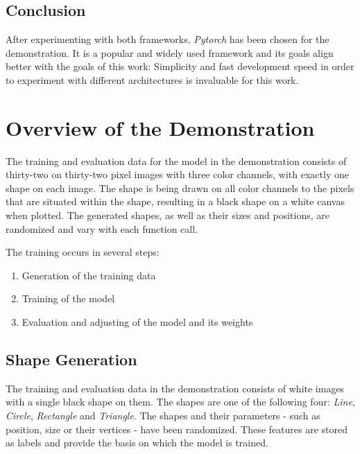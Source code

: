 \documentclass[12pt, a4paper, titlepage]{report}
\begin{document}
\subsection{Conclusion}

After experimenting with both frameworks, \emph{Pytorch} has been chosen for the demonstration. It is a popular and widely used framework and its goals align better with the goals of this work: Simplicity and fast development speed in order to experiment with different architectures is invaluable for this work.
\vspace{0.5cm}


\section{Overview of the Demonstration}

The training and evaluation data for the model in the demonstration consists of thirty-two on thirty-two pixel images with three color channels, with exactly one shape on each image. The shape is being drawn on all color channels to the pixels that are situated within the shape, resulting in a black shape on a white canvas when plotted.
The generated shapes, as well as their sizes and positions, are randomized and vary with each function call.

\vspace{0.2cm}
The training occurs in several steps:

\begin{enumerate}[label=\Roman*.]
   \item Generation of the training data
   \item Training of the model
   \item Evaluation and adjusting of the model and its weights
\end{enumerate}


\subsection{Shape Generation}

The training and evaluation data in the demonstration consists of white images with a single black shape on them. The shapes are one of the following four: \emph{Line}, \emph{Circle}, \emph{Rectangle} and \emph{Triangle}. The shapes and their parameters - such as position, size or their vertices - have been randomized. These features are stored as labels and provide the basis on which the model is trained.
\end{document}
